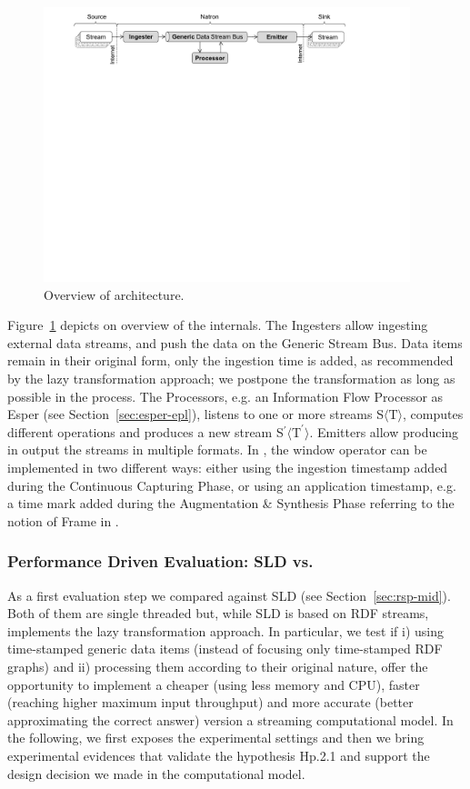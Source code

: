 \begin{figure}[ht]
\centering
\includegraphics[width=0.95\textwidth]{img/natron_schema}
\caption{Overview of \sti{} architecture.}
\label{fig:sti}
\end{figure} 

Figure~\ref{fig:sti} depicts on overview of the \sti{} internals.
The Ingesters allow ingesting external data streams, and push the data on the Generic Stream Bus. Data items remain in their original form, only the ingestion time is added, as recommended by the lazy transformation approach; we postpone the transformation as long as possible in the process. 
The Processors, e.g. an Information Flow Processor as Esper (see Section~\ref{sec:esper-epl}), listens to one or more streams S$\langle\mathrm{T}\rangle$, computes different operations and produces a new stream S$^{\prime}\langle\mathrm{T^{\prime}}\rangle$. 
Emitters allow \sti{} producing in output the streams in multiple formats. 
In \sti{}, the window operator can be implemented in two different ways: either using the ingestion timestamp added during the Continuous Capturing Phase, or using an application timestamp, e.g. a time mark added during the Augmentation \& Synthesis Phase referring to the notion of Frame in \frappe{}.

\subsubsection{Performance Driven Evaluation: SLD vs. \sti{}} \label{sec:comp-mod-eval-performace}

As a first evaluation step we compared \sti{} against SLD (see Section~\ref{sec:rsp-mid}). Both of them are single threaded but, while SLD is based on RDF streams, \sti{} implements the lazy transformation approach.
In particular, we test if i) using time-stamped generic data items (instead of focusing only time-stamped RDF graphs) and ii) processing them according to their original nature, offer the opportunity to implement a cheaper (using less memory and CPU), faster (reaching higher maximum input throughput) and more accurate (better approximating the correct answer) version a streaming computational model. 
In the following, we first exposes the experimental settings and then we bring experimental evidences that validate the hypothesis \textsf{Hp.2.1} and support the design decision we made in the computational model.

